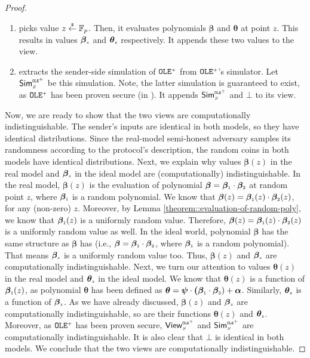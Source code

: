 \begin{proof}
\begin{enumerate}
\item picks value $z\stackrel{\scriptscriptstyle\$}\leftarrow \mathbb{F}_{p}$. Then, it evaluates polynomials $\bm\beta$ and $\bm\theta$  at point $z$. This results in values $\bm\beta_{\scriptscriptstyle z}$ and $\bm\theta_{\scriptscriptstyle z}$ respectively. It appends these two values to the view. 
\item extracts the sender-side simulation of $\mathtt{OLE}^{\scriptscriptstyle +}$ from  $\mathtt{OLE}^{\scriptscriptstyle +}$'s simulator. Let $\mathsf{Sim}^{\scriptscriptstyle \mathtt{OLE}^{\scriptscriptstyle +}}_{\scriptscriptstyle S}$ be this simulation. Note, the latter simulation is guaranteed to exist, as $\mathtt{OLE}^{\scriptscriptstyle +}$ has been proven secure (in \cite{GhoshN19}). It appends $\mathsf{Sim}^{\scriptscriptstyle \mathtt{OLE}^{\scriptscriptstyle +}}_{\scriptscriptstyle S}$ and $\bot$ to its view. 
\end{enumerate}


Now, we are ready to show that the two views are computationally indistinguishable. The sender's inputs are identical in both models, so they have identical distributions. Since the real-model semi-honest adversary samples its randomness according to the protocol's description, the random coins in both models have identical distributions.  Next, we explain why values $\bm\beta(z)$ in the real model and $\bm\beta_{\scriptscriptstyle z}$ in the ideal model are (computationally) indistinguishable. In the real model, $\bm\beta(z)$ is the evaluation of polynomial $\bm\beta=\bm\beta_{\scriptscriptstyle 1}\cdot \bm\beta_{\scriptscriptstyle 2}$ at random point $z$, where $\bm\beta_{\scriptscriptstyle 1}$ is a random polynomial. We know that $\bm\beta(z)=\bm\beta_{\scriptscriptstyle 1}(z)\cdot \bm\beta_{\scriptscriptstyle 2}(z)$, for any (non-zero) $z$.  Moreover, by Lemma \ref{theorem::evaluation-of-random-poly}, we know that $\bm\beta_{\scriptscriptstyle 1}(z)$ is a uniformly random value. Therefore, $\bm\beta(z)=\bm\beta_{\scriptscriptstyle 1}(z)\cdot \bm\beta_{\scriptscriptstyle 2}(z)$ is a uniformly random value as well. In the ideal world, polynomial $\bm\beta$ has the same structure as $\bm\beta$ has (i.e., $\bm\beta=\bm\beta_{\scriptscriptstyle 1}\cdot \bm\beta_{\scriptscriptstyle 2}$, where $\bm\beta_{\scriptscriptstyle 1}$ is a random polynomial). That means $\bm\beta_{\scriptscriptstyle z}$ is a uniformly random value too. Thus,  $\bm\beta(z)$ and $\bm\beta_{\scriptscriptstyle z}$ are computationally indistinguishable. Next, we turn our attention to values $\bm\theta(z)$ in the real model and $\bm\theta_{\scriptscriptstyle z}$ in the ideal model. We know that $\bm\theta(z)$ is a function of $\bm\beta_{\scriptscriptstyle 1}(z)$, as polynomial $\bm\theta$ has been defined as $\bm\theta=\bm\psi\cdot \bm(\bm\beta_{\scriptscriptstyle 1}\cdot \bm\beta_{\scriptscriptstyle 2})+\bm\alpha$. Similarly, $\bm\theta_{\scriptscriptstyle z}$ is a function of  $\bm\beta_{\scriptscriptstyle z}$. As we have already discussed,  $\bm\beta(z)$ and $\bm\beta_{\scriptscriptstyle z}$ are computationally indistinguishable, so are their functions $\bm\theta(z)$ and $\bm\theta_{\scriptscriptstyle z}$. Moreover, as  $\mathtt{OLE}^{\scriptscriptstyle +}$ has been proven secure,  $\mathsf{View}^{\scriptscriptstyle \mathtt{OLE}^{\scriptscriptstyle +}}_{\scriptscriptstyle S}$ and  $\mathsf{Sim}^{\scriptscriptstyle \mathtt{OLE}^{\scriptscriptstyle +}}_{\scriptscriptstyle S}$ are computationally indistinguishable. It is also clear that $\bot$ is identical in both models. We conclude that the two views are computationally indistinguishable.



\end{proof}
